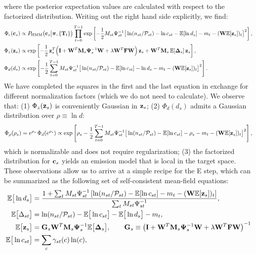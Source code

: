 \documentclass[nofootinbib,amssymb,amsmath]{revtex4}
\newcommand{\vI}{{\bf I}}
\newcommand{\vc}{{\bf c}}
\newcommand{\vz}{{\bf z}}
\newcommand{\vG}{{\bf G}}
\newcommand{\vM}{{\bf M}}
\newcommand{\vW}{{\bf W}}
\newcommand{\vF}{{\bf F}}
\newcommand{\vPsi}{{\bf \Psi}}
\newcommand{\vpi}{{\boldsymbol \pi}}
\newcommand{\PP}{\mathcal{P}}
\newcommand{\EE}{\mathbb{E}}
\begin{document}
where the posterior expectation values are calculated with respect to the factorized distribution. Writing out the right hand side explicitly, we find:
\begin{align}
\label{eq:Phi_c}
\Phi_c(\vc_s) &\propto P_\mathrm{HMM}\big(\vc_s \big|\vpi, \{\mathbf{T}_t\}\big)\prod_{t=0}^{T-1} \exp\left[- \frac{1}{2} M_{st}\Psi_{st}^{-1}\big[\ln(n_{st}/\PP_{st}) - \ln c_{st} - \EE[\ln d_s] - m_t - (\vW \EE[\vz_s])_t\big]^2\right],\\
\Phi_z(\vz_s) &\propto \exp\left[-\frac{1}{2} \, \vz_s^T \Big(\vI + \vW^T \vM_s \vPsi_s^{-1}\vW + \lambda \vW^T \vF \vW \Big)\,\vz_s + \vW^T \vM_{s} \, \EE[\mathbf{\Delta}_{s}]\,\vz_s \right],\\
\Phi_d(d_s) &\propto \exp\left[- \frac{1}{2} \sum_{t=0}^{T-1} M_{st}\Psi_{st}^{-1}\big[\ln(n_{st}/\PP_{st}) - \EE[\ln c_{st}] - \ln d_s - m_t - (\vW \EE[\vz_s])_t\big]^2\right].
\end{align}
We have completed the squares in the first and the last equation in exchange for different normalization factors (which we do not need to calculate). We observe that: (1) $\Phi_z(\vz_s)$ is conveniently Gaussian in $\vz_s$; (2) $\Phi_d(d_s)$ admits a Gaussian distribution over $\rho \equiv \ln d$:
\begin{equation}
\Phi_\rho(\rho_s) = e^{\rho_s}\,\Phi_d(e^{\rho_s}) \propto \exp\left[ \rho_s - \frac{1}{2} \sum_{t=0}^{T-1} M_{st}\Psi_{st}^{-1}\big[\ln(n_{st}/\PP_{st}) - \EE[\ln c_{st}] - \rho_s - m_t - (\vW \EE[\vz_s])_t\big]^2\right],
\end{equation}
which is normalizable and does not require regularization; (3) the factorized distribution for $\vc_s$ yields an emission model that is local in the target space. These observations allow us to arrive at a simple recipe for the E step, which can be summarized as the following set of self-consistent mean-field equations:
\begin{subequations}
\begin{align}
\EE\big[\ln d_s \big] &= \frac{1 + \sum_t M_{st} \Psi_{st}^{-1}\left[\ln(n_{st}/\PP_{st}) - \EE[\ln c_{st}] - m_t - (\vW \EE[\vz_s])_t\right]}{\sum_t M_{st} \Psi_{st}^{-1}},\nonumber\\
\EE\big[\Delta_{st}\big] &= \ln(n_{st}/\PP_{st}) - \EE\big[\ln c_{st}\big] - \EE\big[\ln d_s\big] - m_t,\\
\EE\big[\vz_s\big] &= \vG_s \vW^T \vM_s \vPsi_s^{-1} \EE\big[\mathbf{\Delta}_s\big],\qquad \vG_s \equiv \left( \vI + \vW^T \vM_s \vPsi_s^{-1} \vW + \lambda \vW^T \vF \vW \right)^{-1}\\
\EE\big[\ln c_{st}\big] &= \sum_{c} \gamma_{st}(c) \ln(c),
\end{align}
\end{subequations}
\end{document}
